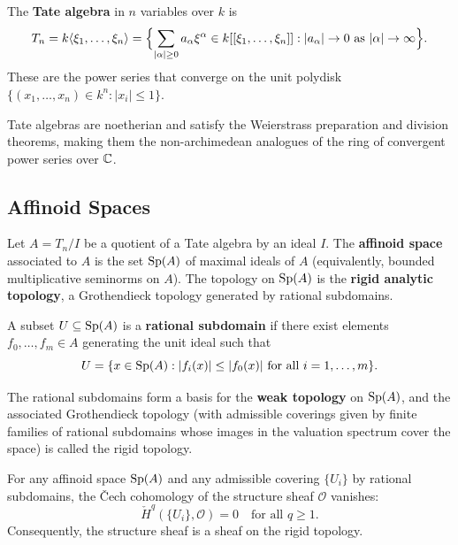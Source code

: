 \begin{definition}
The \textbf{Tate algebra} in \(n\) variables over \(k\) is
\[
T_n = k\langle \xi_1, \dots, \xi_n \rangle = \Bigl\{ \sum_{|\alpha| \geq 0} a_\alpha \xi^\alpha \in k[[\xi_1,\dots,\xi_n]] : |a_\alpha| \to 0 \text{ as } |\alpha| \to \infty \Bigr\}.
\]
These are the power series that converge on the unit polydisk \(\{(x_1,\dots,x_n) \in k^n : |x_i| \leq 1\}\).
\end{definition}

Tate algebras are noetherian and satisfy the Weierstrass preparation and division theorems, making them the non-archimedean analogues of the ring of convergent power series over \(\mathbb{C}\).

\subsection{Affinoid Spaces}

Let \(A = T_n / I\) be a quotient of a Tate algebra by an ideal \(I\). The \textbf{affinoid space} associated to \(A\) is the set \(\operatorname{Sp}(A)\) of maximal ideals of \(A\) (equivalently, bounded multiplicative seminorms on \(A\)). The topology on \(\operatorname{Sp}(A)\) is the \textbf{rigid analytic topology}, a Grothendieck topology generated by rational subdomains.

\begin{definition}
A subset \(U \subseteq \operatorname{Sp}(A)\) is a \textbf{rational subdomain} if there exist elements \(f_0, \dots, f_m \in A\) generating the unit ideal such that
\[
U = \{x \in \operatorname{Sp}(A) : |f_i(x)| \leq |f_0(x)| \text{ for all } i = 1, \dots, m\}.
\]
\end{definition}

The rational subdomains form a basis for the \textbf{weak topology} on \(\operatorname{Sp}(A)\), and the associated Grothendieck topology (with admissible coverings given by finite families of rational subdomains whose images in the valuation spectrum cover the space) is called the rigid topology.

\begin{theorem}
For any affinoid space \(\operatorname{Sp}(A)\) and any admissible covering \(\{U_i\}\) by rational subdomains, the \v{C}ech cohomology of the structure sheaf \(\mathcal{O}\) vanishes:
\[
\check{H}^q(\{U_i\}, \mathcal{O}) = 0 \quad \text{for all } q \geq 1.
\]
Consequently, the structure sheaf is a sheaf on the rigid topology.
\end{theorem}

